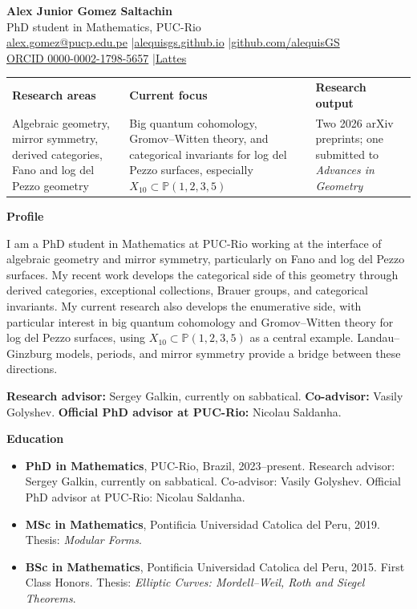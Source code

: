 \documentclass[10pt,a4paper]{article}
\newcommand{\cvsection}[1]{%
  \vspace{6pt}
  {\large\bfseries\color{cvteal}#1}\par
  \vspace{1pt}{\color{cvrule}\hrule height 0.5pt}\vspace{3pt}
}
\newcommand{\cvitem}[1]{\item #1}
\begin{document}
\begin{center}
  {\Huge\bfseries\color{cvnavy} Alex Junior Gomez Saltachin}\\[3pt]
  PhD student in Mathematics, PUC-Rio\\[3pt]
  \href{mailto:alex.gomez@pucp.edu.pe}{alex.gomez@pucp.edu.pe}
  \quad|\quad \href{https://alequisgs.github.io}{alequisgs.github.io}
  \quad|\quad \href{https://github.com/alequisGS}{github.com/alequisGS}\\
  \href{https://orcid.org/0000-0002-1798-5657}{ORCID 0000-0002-1798-5657}
  \quad|\quad \href{http://lattes.cnpq.br/1837761002962927}{Lattes}
\end{center}

\vspace{3pt}
\begin{tabularx}{\textwidth}{|X|X|X|}
\hline
\textbf{\color{cvteal}Research areas} &
\textbf{\color{cvteal}Current focus} &
\textbf{\color{cvteal}Research output} \\
Algebraic geometry, mirror symmetry, derived categories, Fano and log del Pezzo geometry &
Big quantum cohomology, Gromov--Witten theory, and categorical invariants for log del Pezzo surfaces, especially \(X_{10}\subset\mathbb P(1,2,3,5)\) &
Two 2026 arXiv preprints; one submitted to \emph{Advances in Geometry} \\
\hline
\end{tabularx}

\cvsection{Profile}
I am a PhD student in Mathematics at PUC-Rio working at the interface of algebraic geometry and mirror symmetry, particularly on Fano and log del Pezzo surfaces. My recent work develops the categorical side of this geometry through derived categories, exceptional collections, Brauer groups, and categorical invariants. My current research also develops the enumerative side, with particular interest in big quantum cohomology and Gromov--Witten theory for log del Pezzo surfaces, using \(X_{10}\subset\mathbb P(1,2,3,5)\) as a central example. Landau--Ginzburg models, periods, and mirror symmetry provide a bridge between these directions.

\textbf{Research advisor:} Sergey Galkin, currently on sabbatical. \textbf{Co-advisor:} Vasily Golyshev. \textbf{Official PhD advisor at PUC-Rio:} Nicolau Saldanha.

\cvsection{Education}
\begin{itemize}
  \cvitem{\textbf{PhD in Mathematics}, PUC-Rio, Brazil, 2023--present. Research advisor: Sergey Galkin, currently on sabbatical. Co-advisor: Vasily Golyshev. Official PhD advisor at PUC-Rio: Nicolau Saldanha.}
  \cvitem{\textbf{MSc in Mathematics}, Pontificia Universidad Catolica del Peru, 2019. Thesis: \emph{Modular Forms}.}
  \cvitem{\textbf{BSc in Mathematics}, Pontificia Universidad Catolica del Peru, 2015. First Class Honors. Thesis: \emph{Elliptic Curves: Mordell--Weil, Roth and Siegel Theorems}.}
\end{itemize}
\end{document}

